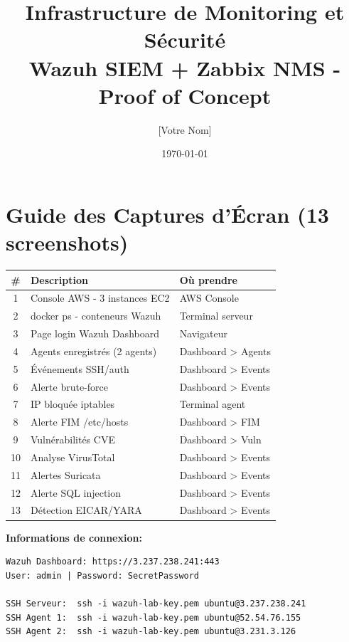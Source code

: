 \documentclass[12pt,a4paper]{article}
\title{
    \vspace{-2cm}
    \textbf{Infrastructure de Monitoring et Sécurité}\\
    \large Wazuh SIEM + Zabbix NMS - Proof of Concept
}
\author{[Votre Nom]}
\date{\today}
\begin{document}
\maketitle
\tableofcontents
\newpage

\section*{Guide des Captures d'Écran (13 screenshots)}

\begin{center}
\begin{tabular}{|c|p{8cm}|p{4cm}|}
\hline
\textbf{\#} & \textbf{Description} & \textbf{Où prendre} \\
\hline
1 & Console AWS - 3 instances EC2 & AWS Console \\
2 & docker ps - conteneurs Wazuh & Terminal serveur \\
3 & Page login Wazuh Dashboard & Navigateur \\
4 & Agents enregistrés (2 agents) & Dashboard > Agents \\
5 & Événements SSH/auth & Dashboard > Events \\
6 & Alerte brute-force & Dashboard > Events \\
7 & IP bloquée iptables & Terminal agent \\
8 & Alerte FIM /etc/hosts & Dashboard > FIM \\
9 & Vulnérabilités CVE & Dashboard > Vuln \\
10 & Analyse VirusTotal & Dashboard > Events \\
11 & Alertes Suricata & Dashboard > Events \\
12 & Alerte SQL injection & Dashboard > Events \\
13 & Détection EICAR/YARA & Dashboard > Events \\
\hline
\end{tabular}
\end{center}

\vspace{0.5cm}
\textbf{Informations de connexion:}
\begin{lstlisting}
Wazuh Dashboard: https://3.237.238.241:443
User: admin | Password: SecretPassword

SSH Serveur:  ssh -i wazuh-lab-key.pem ubuntu@3.237.238.241
SSH Agent 1:  ssh -i wazuh-lab-key.pem ubuntu@52.54.76.155
SSH Agent 2:  ssh -i wazuh-lab-key.pem ubuntu@3.231.3.126
\end{lstlisting}
\end{document}
